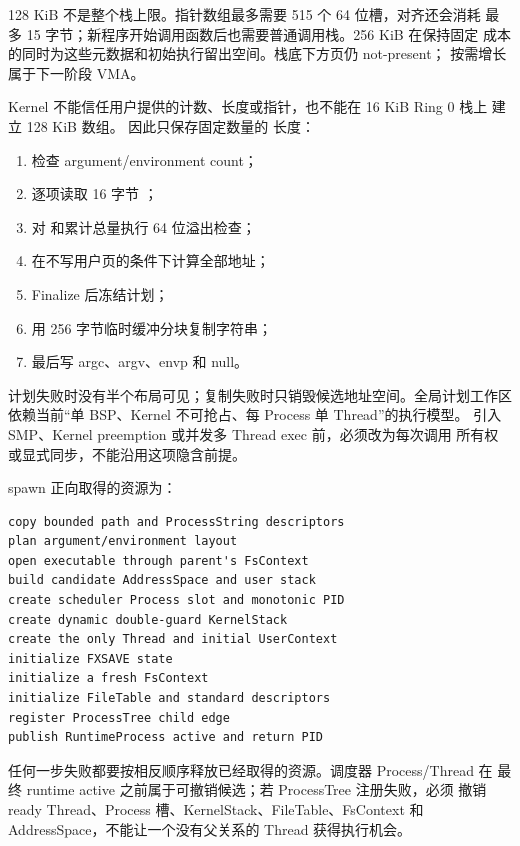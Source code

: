 128 KiB 不是整个栈上限。指针数组最多需要 515 个 64 位槽，对齐还会消耗
最多 15 字节；新程序开始调用函数后也需要普通调用栈。256 KiB 在保持固定
成本的同时为这些元数据和初始执行留出空间。栈底下方页仍 not-present；
按需增长属于下一阶段 VMA。

Kernel 不能信任用户提供的计数、长度或指针，也不能在 16 KiB Ring 0 栈上
建立 128 KiB 数组。 因此只保存固定数量的
 长度：

\begin{enumerate}
  \item 检查 argument/environment count；
  \item 逐项读取 16 字节 ；
  \item 对  和累计总量执行 64 位溢出检查；
  \item 在不写用户页的条件下计算全部地址；
  \item Finalize 后冻结计划；
  \item 用 256 字节临时缓冲分块复制字符串；
  \item 最后写 argc、argv、envp 和 null。
\end{enumerate}

计划失败时没有半个布局可见；复制失败时只销毁候选地址空间。全局计划工作区
依赖当前“单 BSP、Kernel 不可抢占、每 Process 单 Thread”的执行模型。
引入 SMP、Kernel preemption 或并发多 Thread exec 前，必须改为每次调用
所有权或显式同步，不能沿用这项隐含前提。

spawn 正向取得的资源为：

\begin{lstlisting}[caption={spawn 的正向所有权链}]
copy bounded path and ProcessString descriptors
plan argument/environment layout
open executable through parent's FsContext
build candidate AddressSpace and user stack
create scheduler Process slot and monotonic PID
create dynamic double-guard KernelStack
create the only Thread and initial UserContext
initialize FXSAVE state
initialize a fresh FsContext
initialize FileTable and standard descriptors
register ProcessTree child edge
publish RuntimeProcess active and return PID
\end{lstlisting}

任何一步失败都要按相反顺序释放已经取得的资源。调度器 Process/Thread 在
最终 runtime active 之前属于可撤销候选；若 ProcessTree 注册失败，必须
撤销 ready Thread、Process 槽、KernelStack、FileTable、FsContext 和
AddressSpace，不能让一个没有父关系的 Thread 获得执行机会。

